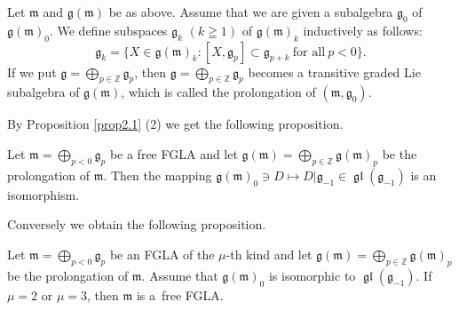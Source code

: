 \documentclass[pdftex]{sigma}
\numberwithin{equation}{section}
\numberwithin{theorem}{section}
\numberwithin{proposition}{section}
\numberwithin{lemma}{section}
\numberwithin{corollary}{section}
\numberwithin{definition}{section}
\numberwithin{example}{section}
\numberwithin{remark}{section}
\numberwithin{note}{section}
\newcommand{\gl}{\operatorname{\mathfrak{gl}}}
\newcommand{\gla}[1]{\mathfrak#1=\bigoplus\limits_{p\in\mathbb Z}\mathfrak#1_p} \renewcommand{\labelenumi}{{\rm (\arabic{enumi})}}
\begin{document}
Let $\mathfrak m$ and $\mathfrak g(\mathfrak m)$ be as above.
Assume that we are given a subalgebra $\mathfrak g_0$ of
$\mathfrak g(\mathfrak m)_0$.
We def\/ine subspaces $\mathfrak g_k$ $(k\geqq 1)$ of
$\mathfrak g(\mathfrak m)_k$ inductively as follows:
\[
\mathfrak g_k=\{ X\in\mathfrak g(\mathfrak m)_k:
[X,\mathfrak g_p]\subset \mathfrak g_{p+k}\
\text{for all}\ p<0 \}.
\]
If we put $\gla g$, then
$\gla g$ becomes a transitive graded Lie subalgebra of $\mathfrak g(\mathfrak m)$,
which is called the prolongation of
$(\mathfrak m,\mathfrak g_0)$.

By Proposition \ref{prop2.1} (2) we get the following proposition.
\begin{proposition}\label{prop4.1} Let $\mathfrak m=\bigoplus\limits_{p<0}\mathfrak g_p$ be a
free FGLA and let $\mathfrak g(\mathfrak m)
=\bigoplus\limits_{p\in\mathbb Z}\mathfrak g(\mathfrak m)_p$
be the prolongation of $\mathfrak m$.
Then the mapping $\mathfrak g(\mathfrak m)_0\ni D\mapsto D|\mathfrak g_{-1}
\in\gl(\mathfrak g_{-1})$ is an isomorphism.
\end{proposition}
Conversely we obtain the following proposition.

\begin{proposition}\label{prop4.2}
Let $\mathfrak m=\bigoplus\limits_{p<0}\mathfrak g_p$ be an
FGLA of the $\mu$-th kind and let
$\mathfrak g(\mathfrak m)
=\bigoplus\limits_{p\in\mathbb Z}\mathfrak g(\mathfrak m)_p$
be the prolongation of $\mathfrak m$.
Assume that $\mathfrak g(\mathfrak m)_0$ is isomorphic to
$\gl(\mathfrak g_{-1})$.
If $\mu=2$ or $\mu=3$,
then $\mathfrak m$ is a~free FGLA.
\end{proposition}
\end{document}
